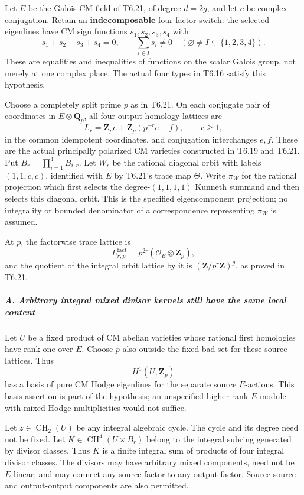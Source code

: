 \documentclass[11pt,a4paper]{article}
\theoremstyle{definition}
\begin{document}
Let \(E\) be the Galois CM field of T6.21, of degree \(d=2g\), and let \(c\) be complex conjugation. Retain an \textbf{indecomposable} four-factor switch: the selected eigenlines have CM sign functions \(s_1,s_2,s_3,s_4\) with \[
 s_1+s_2+s_3+s_4=0,
 \qquad
 \sum_{i\in I}s_i\ne0
 \quad(\varnothing\ne I\subsetneq\{1,2,3,4\}).
 \tag{T22.1}
\] These are equalities and inequalities of functions on the scalar Galois group, not merely at one complex place. The actual four types in T6.16 satisfy this hypothesis.

Choose a completely split prime \(p\) as in T6.21. On each conjugate pair of coordinates in \(E\otimes\mathbf Q_p\), all four output homology lattices are \[
 L_r=\mathbf Z_p e+\mathbf Z_p(p^{-r}e+f),
 \qquad r\ge1,
 \tag{T22.2}
\] in the common idempotent coordinates, and conjugation interchanges \(e,f\). These are the actual principally polarized CM varieties constructed in T6.19 and T6.21. Put \(B_r=\prod_{i=1}^4B_{i,r}\). Let \(W_r\) be the rational diagonal orbit with labels \((1,1,c,c)\), identified with \(E\) by T6.21's trace map \(\Theta\). Write \(\pi_W\) for the rational projection which first selects the degree-\((1,1,1,1)\) Kunneth summand and then selects this diagonal orbit. This is the specified eigencomponent projection; no integrality or bounded denominator of a correspondence representing \(\pi_W\) is assumed.

At \(p\), the factorwise trace lattice is \[
 L^{\mathrm{fact}}_{r,p}=p^{2r}(\mathcal O_E\otimes\mathbf Z_p),
 \tag{T22.3}
\] and the quotient of the integral orbit lattice by it is \((\mathbf Z/p^r\mathbf Z)^g\), as proved in T6.21.

\subparagraph{A. Arbitrary integral mixed divisor kernels still have the same local content}\label{a.-arbitrary-integral-mixed-divisor-kernels-still-have-the-same-local-content}

Let \(U\) be a fixed product of CM abelian varieties whose rational first homologies have rank one over \(E\). Choose \(p\) also outside the fixed bad set for these source lattices. Thus \[
 H^1(U,\mathbf Z_p)
\] has a basis of pure CM Hodge eigenlines for the separate source \(E\)-actions. This basis assertion is part of the hypothesis; an unspecified higher-rank \(E\)-module with mixed Hodge multiplicities would not suffice.

Let \(z\in\operatorname{CH}_2(U)\) be any integral algebraic cycle. The cycle and its degree need not be fixed. Let \(K\in\operatorname{CH}^4(U\times B_r)\) belong to the integral subring generated by divisor classes. Thus \(K\) is a finite integral sum of products of four integral divisor classes. The divisors may have arbitrary mixed components, need not be \(E\)-linear, and may connect any source factor to any output factor. Source-source and output-output components are also permitted.
\end{document}
